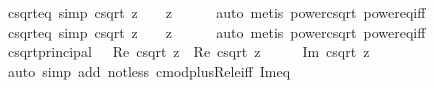 \begin{isabellebody}
\isamarkupfalse%
%
\endisatagproof
{\isafoldproof}%
%
\isadelimproof
\isanewline
%
\endisadelimproof
\isanewline
{}\isamarkupfalse%
\ csqrt{\isacharunderscore}{\kern0pt}eq{\isacharunderscore}{\kern0pt}{}\ {\isacharbrackleft}{\kern0pt}simp{\isacharbrackright}{\kern0pt}{\isacharcolon}{\kern0pt}\ {\isachardoublequoteopen}csqrt\ z\ {\isacharequal}{\kern0pt}\ {}\ {\isasymlongleftrightarrow}\ z\ {\isacharequal}{\kern0pt}\ {}{\isachardoublequoteclose}\isanewline
%
\isadelimproof
\ \ %
\endisadelimproof
%
\isatagproof
{}\isamarkupfalse%
\ auto\ {\isacharparenleft}{\kern0pt}metis\ power{}{\isacharunderscore}{\kern0pt}csqrt\ power{\isacharunderscore}{\kern0pt}eq{\isacharunderscore}{\kern0pt}{}{\isacharunderscore}{\kern0pt}iff{\isacharparenright}{\kern0pt}%
\endisatagproof
{\isafoldproof}%
%
\isadelimproof
\isanewline
%
\endisadelimproof
\isanewline
{}\isamarkupfalse%
\ csqrt{\isacharunderscore}{\kern0pt}eq{\isacharunderscore}{\kern0pt}{}\ {\isacharbrackleft}{\kern0pt}simp{\isacharbrackright}{\kern0pt}{\isacharcolon}{\kern0pt}\ {\isachardoublequoteopen}csqrt\ z\ {\isacharequal}{\kern0pt}\ {}\ {\isasymlongleftrightarrow}\ z\ {\isacharequal}{\kern0pt}\ {}{\isachardoublequoteclose}\isanewline
%
\isadelimproof
\ \ %
\endisadelimproof
%
\isatagproof
{}\isamarkupfalse%
\ auto\ {\isacharparenleft}{\kern0pt}metis\ power{}{\isacharunderscore}{\kern0pt}csqrt\ power{}{\isacharunderscore}{\kern0pt}eq{\isacharunderscore}{\kern0pt}{}{\isacharunderscore}{\kern0pt}iff{\isacharparenright}{\kern0pt}%
\endisatagproof
{\isafoldproof}%
%
\isadelimproof
\isanewline
%
\endisadelimproof
\isanewline
{}\isamarkupfalse%
\ csqrt{\isacharunderscore}{\kern0pt}principal{\isacharcolon}{\kern0pt}\ {\isachardoublequoteopen}{}\ {\isacharless}{\kern0pt}\ Re\ {\isacharparenleft}{\kern0pt}csqrt\ z{\isacharparenright}{\kern0pt}\ {\isasymor}\ Re\ {\isacharparenleft}{\kern0pt}csqrt\ z{\isacharparenright}{\kern0pt}\ {\isacharequal}{\kern0pt}\ {}\ {\isasymand}\ {}\ {\isasymle}\ Im\ {\isacharparenleft}{\kern0pt}csqrt\ z{\isacharparenright}{\kern0pt}{\isachardoublequoteclose}\isanewline
%
\isadelimproof
\ \ %
\endisadelimproof
%
\isatagproof
{}\isamarkupfalse%
\ {\isacharparenleft}{\kern0pt}auto\ simp\ add{\isacharcolon}{\kern0pt}\ not{\isacharunderscore}{\kern0pt}less\ cmod{\isacharunderscore}{\kern0pt}plus{\isacharunderscore}{\kern0pt}Re{\isacharunderscore}{\kern0pt}le{\isacharunderscore}{\kern0pt}{}{\isacharunderscore}{\kern0pt}iff\ Im{\isacharunderscore}{\kern0pt}eq{\isacharunderscore}{\kern0pt}{}{\isacharparenright}{\kern0pt}%

\end{isabellebody}
